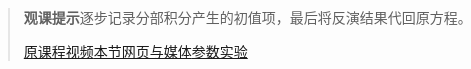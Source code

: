 \begin{quote}\small\textbf{观课提示}\quad 逐步记录分部积分产生的初值项，最后将反演结果代回原方程。

\href{https://www.youtube.com/watch?v=FE-hM1kRK4Y}{原课程视频}\quad\href{https://vitael04213.github.io/3blue1brown-notes/lessons/laplace-for-odes.html}{本节网页与媒体}\quad\href{https://vitael04213.github.io/3blue1brown-notes/lab.html\#phase}{参数实验}
\end{quote}
